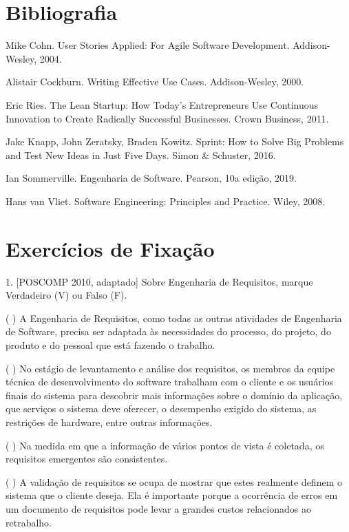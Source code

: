 \documentclass[
  11pt,
  twoside]{book}
\begin{document}
\hypertarget{bibliografia-2}{%
\section*{Bibliografia}\label{bibliografia-2}}

Mike Cohn. User Stories Applied: For Agile Software Development.
Addison-Wesley, 2004.

Alistair Cockburn. Writing Effective Use Cases. Addison-Wesley, 2000.

Eric Ries. The Lean Startup: How Today's Entrepreneurs Use Continuous
Innovation to Create Radically Successful Businesses. Crown Business,
2011.

Jake Knapp, John Zeratsky, Braden Kowitz. Sprint: How to Solve Big
Problems and Test New Ideas in Just Five Days. Simon \& Schuster, 2016.

Ian Sommerville. Engenharia de Software. Pearson, 10a edição, 2019.

Hans van Vliet. Software Engineering: Principles and Practice. Wiley,
2008.

\hypertarget{exercuxedcios-de-fixauxe7uxe3o-2}{%
\section*{Exercícios de
Fixação}\label{exercuxedcios-de-fixauxe7uxe3o-2}}

1. {[}POSCOMP 2010, adaptado{]} Sobre Engenharia de Requisitos, marque
Verdadeiro (V) ou Falso (F).

( ) A Engenharia de Requisitos, como todas as outras atividades de
Engenharia de Software, precisa ser adaptada às necessidades do
processo, do projeto, do produto e do pessoal que está fazendo o
trabalho.

( ) No estágio de levantamento e análise dos requisitos, os membros da
equipe técnica de desenvolvimento do software trabalham com o cliente e
os usuários finais do sistema para descobrir mais informações sobre o
domínio da aplicação, que serviços o sistema deve oferecer, o desempenho
exigido do sistema, as restrições de hardware, entre outras informações.

( ) Na medida em que a informação de vários pontos de vista é coletada,
os requisitos emergentes são consistentes.

( ) A validação de requisitos se ocupa de mostrar que estes realmente
definem o sistema que o cliente deseja. Ela é importante porque a
ocorrência de erros em um documento de requisitos pode levar a grandes
custos relacionados ao retrabalho.
\end{document}

